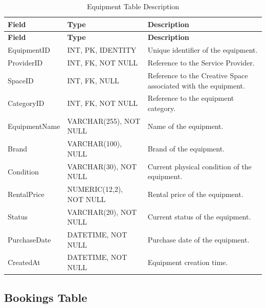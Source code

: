 \begin{longtable}{
		|>{\raggedright\arraybackslash}p{3.2cm}|
		>{\raggedright\arraybackslash}p{4.2cm}|
		>{\raggedright\arraybackslash}p{5.0cm}|
	}
	\caption{Equipment Table Description}
	\label{tab:equipment}\\
	\hline
	\textbf{Field} & \textbf{Type} & \textbf{Description} \\ \hline
	\endfirsthead
	\hline
	\textbf{Field} & \textbf{Type} & \textbf{Description} \\ \hline
	\endhead
	
	EquipmentID & INT, PK, IDENTITY &
	Unique identifier of the equipment. \\ \hline
	
	ProviderID & INT, FK, NOT NULL &
	Reference to the Service Provider. \\ \hline
	
	SpaceID & INT, FK, NULL &
	Reference to the Creative Space associated with the equipment. \\ \hline
	
	CategoryID & INT, FK, NOT NULL &
	Reference to the equipment category. \\ \hline
	
	EquipmentName & VARCHAR(255), NOT NULL &
	Name of the equipment. \\ \hline
	
	Brand & VARCHAR(100), NULL &
	Brand of the equipment. \\ \hline
	
	Condition & VARCHAR(30), NOT NULL &
	Current physical condition of the equipment. \\ \hline
	
	RentalPrice & NUMERIC(12,2), NOT NULL &
	Rental price of the equipment. \\ \hline
	
	Status & VARCHAR(20), NOT NULL &
	Current status of the equipment. \\ \hline
	
	PurchaseDate & DATETIME, NOT NULL &
	Purchase date of the equipment. \\ \hline
	
	CreatedAt & DATETIME, NOT NULL &
	Equipment creation time. \\ \hline
	
\end{longtable}


\subsection{Bookings Table}

